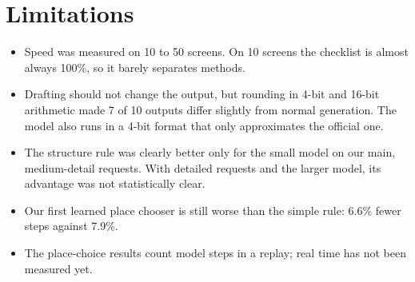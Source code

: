 \documentclass[10pt,a4paper]{article}
\begin{document}
\section{Limitations}
\begin{itemize}[itemsep=1pt]
\item Speed was measured on 10 to 50 screens. On 10 screens the checklist is almost always 100\%, so it barely separates methods.
\item Drafting should not change the output, but rounding in 4-bit and 16-bit arithmetic made 7 of 10 outputs differ slightly from normal generation. The model also runs in a 4-bit format that only approximates the official one.
\item The structure rule was clearly better only for the small model on our main, medium-detail requests. With detailed requests and the larger model, its advantage was not statistically clear.
\item Our first learned place chooser is still worse than the simple rule: 6.6\% fewer steps against 7.9\%.
\item The place-choice results count model steps in a replay; real time has not been measured yet.
\end{itemize}
\end{document}
